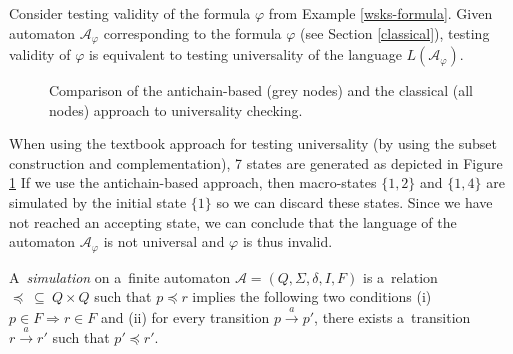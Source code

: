 \noindent\hrulefill
\begin{example}
Consider testing validity of the formula $\varphi$ from Example
\ref{wsks-formula}.
Given automaton $\mathcal{A}_\varphi$ corresponding to the formula $\varphi$
(see Section \ref{classical}), testing validity of $\varphi$ is
equivalent to testing universality of the language $L(\mathcal{A}_\varphi)$.

\begin{figure}[h!]
 \begin{center}
 \end{center}
 \caption{Comparison of the antichain-based (grey nodes) and the classical (all
 nodes) approach to universality checking.}
 \label{compare}
\end{figure}

When using the textbook approach for testing universality (by using the subset
construction and complementation), 7 states are generated as depicted in Figure
\ref{compare} If we use the antichain-based approach, then macro-states $\{1,
2\}$ and $\{1, 4\}$ are simulated by the initial state $\{1\}$ so we can
discard these states.
Since we have not reached an accepting state, we can conclude that the language
of the automaton $\mathcal{A}_\varphi$ is not universal and $\varphi$ is thus
invalid.
\end{example}
\noindent\hrulefill

\begin{defz}
A~\emph{simulation} on a~finite automaton $\mathcal{A} = (Q, \Sigma, \delta, I,
F)$ is a~relation $\preceq~\subseteq~Q \times Q$ such that $p \preceq r$
implies the following two conditions (i) $p \in F \Rightarrow r \in F$ and (ii) for
every transition $p \overset{a}{\longrightarrow} p'$, there exists a~transition $r
\overset{a}{\longrightarrow} r'$ such that $p' \preceq r'$.
\end{defz}

